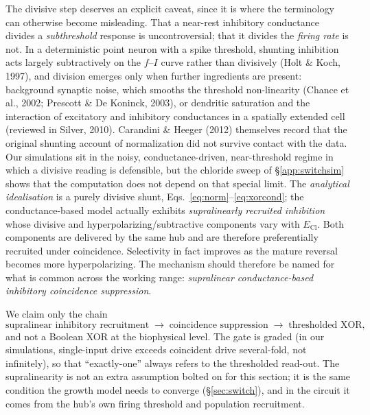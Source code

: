 \documentclass[11pt,a4paper]{article}
\newcommand{\ECl}{E_{\mathrm{Cl}}}
\begin{document}
The divisive step deserves an explicit caveat, since it is where the terminology can otherwise become misleading. That a near-rest inhibitory conductance divides a \emph{subthreshold} response is uncontroversial; that it divides the \emph{firing rate} is not. In a deterministic point neuron with a spike threshold, shunting inhibition acts largely subtractively on the $f$--$I$ curve rather than divisively (Holt \& Koch, 1997), and division emerges only when further ingredients are present: background synaptic noise, which smooths the threshold non-linearity (Chance et al., 2002; Prescott \& De Koninck, 2003), or dendritic saturation and the interaction of excitatory and inhibitory conductances in a spatially extended cell (reviewed in Silver, 2010). Carandini \& Heeger (2012) themselves record that the original shunting account of normalization did not survive contact with the data. Our simulations sit in the noisy, conductance-driven, near-threshold regime in which a divisive reading is defensible, but the chloride sweep of \S\ref{app:switchsim} shows that the computation does not depend on that special limit. The \emph{analytical idealisation} is a purely divisive shunt, Eqs.~\eqref{eq:norm}--\eqref{eq:xorcond}; the conductance-based model actually exhibits \emph{supralinearly recruited inhibition} whose divisive and hyperpolarizing/subtractive components vary with $\ECl$. Both components are delivered by the same hub and are therefore preferentially recruited under coincidence. Selectivity in fact improves as the mature reversal becomes more hyperpolarizing. The mechanism should therefore be named for what is common across the working range: \emph{supralinear conductance-based inhibitory coincidence suppression}.

We claim only the chain
\[
\text{supralinear inhibitory recruitment}
\;\longrightarrow\;
\text{coincidence suppression}
\;\longrightarrow\;
\text{thresholded XOR},
\]
and not a Boolean XOR at the biophysical level. The gate is graded (in our simulations, single-input drive exceeds coincident drive several-fold, not infinitely), so that ``exactly-one'' always refers to the thresholded read-out. The supralinearity is not an extra assumption bolted on for this section; it is the same condition the growth model needs to converge (\S\ref{sec:switch}), and in the circuit it comes from the hub's own firing threshold and population recruitment.
\end{document}
